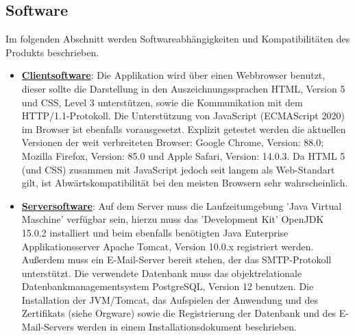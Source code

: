 \documentclass{article}
\begin{document}
\subsection{Software}
Im folgenden Abschnitt werden Softwareabhängigkeiten und Kompatibilitäten des Produkts beschrieben.
\begin{itemize}
\item \underline{\textbf{Clientsoftware}}: \linebreak
Die Applikation wird über einen Webbrowser benutzt, dieser sollte die Darstellung in den Auszeichnungssprachen HTML, Version 5 und CSS, Level 3 unterstützen, sowie die Kommunikation mit dem HTTP/1.1-Protokoll. Die Unterstützung von JavaScript (ECMAScript 2020) im Browser ist ebenfalls vorausgesetzt. Explizit getestet werden die aktuellen Versionen der weit verbreiteten Browser: Google Chrome, Version: 88.0; Mozilla Firefox, Version: 85.0 und Apple Safari, Version: 14.0.3. Da HTML 5 (und CSS) zusammen mit JavaScript jedoch seit langem als Web-Standart gilt, ist Abwärtskompatibilität bei den meisten Browsern sehr wahrscheinlich.
\item \underline{\textbf{Serversoftware}}: \linebreak
Auf dem Server muss die Laufzeitumgebung 'Java Virtual Maschine' verfügbar sein, hierzu muss das 'Development Kit' OpenJDK 15.0.2 installiert und beim ebenfalls benötigten Java Enterprise Applikationsserver Apache Tomcat, Version 10.0.x registriert werden. Außerdem muss ein E-Mail-Server bereit stehen, der das SMTP-Protokoll unterstützt. Die verwendete Datenbank muss das objektrelationale Datenbankmanagementsystem PostgreSQL, Version 12 benutzen. Die Installation der JVM/Tomcat, das Aufspielen der Anwendung und des Zertifikats (siehe Orgware) sowie die Registrierung der Datenbank und des E-Mail-Servers werden in einem Installationsdokument beschrieben.
\end{itemize}
\end{document}
